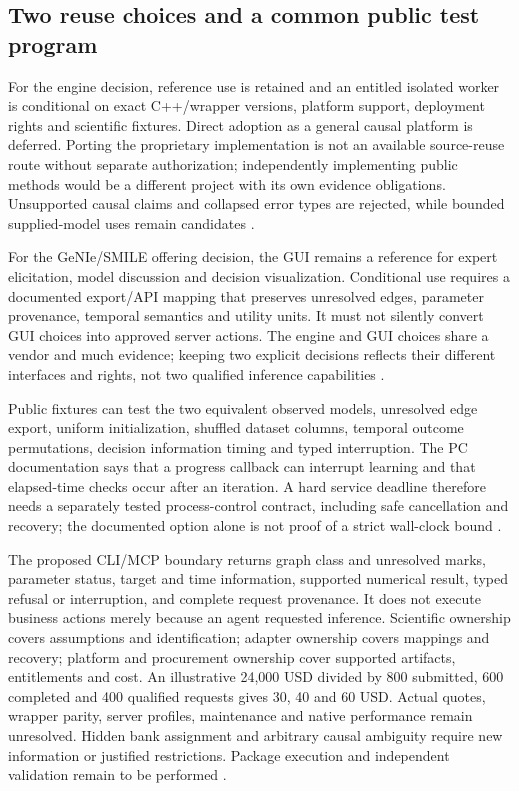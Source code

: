 \subsection{Two reuse choices and a common public test program}
For the engine decision, reference use is retained and an entitled isolated
worker is conditional on exact C++/wrapper versions, platform support,
deployment rights and scientific fixtures. Direct adoption as a general
causal platform is deferred. Porting the proprietary implementation is not
an available source-reuse route without separate authorization; independently
implementing public methods would be a different project with its own
evidence obligations. Unsupported causal claims and collapsed error types
are rejected, while bounded supplied-model uses remain candidates
\citep{exec13_smile_intro,exec13_smile_license,exec24_smile_choice}.

For the GeNIe/SMILE offering decision, the GUI remains a reference for expert
elicitation, model discussion and decision visualization. Conditional use
requires a documented export/API mapping that preserves unresolved edges,
parameter provenance, temporal semantics and utility units. It must not
silently convert GUI choices into approved server actions. The engine and
GUI choices share a vendor and much evidence; keeping two explicit
decisions reflects their different interfaces and rights, not two qualified
inference capabilities \citep{exec24_smile_choice}.

Public fixtures can test the two equivalent observed models, unresolved
edge export, uniform initialization, shuffled dataset columns, temporal
outcome permutations, decision information timing and typed interruption.
The PC documentation says that a progress callback can interrupt learning
and that elapsed-time checks occur after an iteration. A hard service
deadline therefore needs a separately tested process-control contract,
including safe cancellation and recovery; the documented option alone is
not proof of a strict wall-clock bound
\citep{exec13_smile_pc,exec24_smile_choice}.

The proposed CLI/MCP boundary returns graph class and unresolved marks,
parameter status, target and time information, supported numerical result,
typed refusal or interruption, and complete request provenance. It does
not execute business actions merely because an agent requested inference.
Scientific ownership covers assumptions and identification; adapter
ownership covers mappings and recovery; platform and procurement ownership
cover supported artifacts, entitlements and cost. An illustrative
24,000 USD divided by 800 submitted, 600 completed and 400 qualified
requests gives 30, 40 and 60 USD. Actual quotes, wrapper parity, server
profiles, maintenance and native performance remain unresolved. Hidden
bank assignment and arbitrary causal ambiguity require new information or
justified restrictions. Package execution and independent validation remain to be performed \citep{exec24_smile_choice}.


